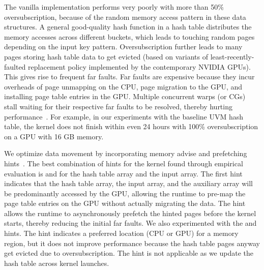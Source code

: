 \documentclass[12pt,a4paper]{article}
\begin{document}
The vanilla implementation performs very poorly with more than 50\%
oversubscription, because of the random memory access pattern in these data
structures. A general good-quality hash function in a hash table distributes the
memory accesses across different buckets, which leads to touching random pages
depending on the input key pattern. Oversubscription further leads to many pages
storing hash table data to get evicted (based on variants of least-recently-faulted replacement
policy implemented by the contemporary NVIDIA GPUs). This gives rise to frequent
far faults. Far faults are expensive because they incur overheads of page
unmapping on the CPU, page migration to the GPU, and installing page table
entries in the GPU. Multiple concurrent warps (or CGs) stall waiting for their
respective far faults to be resolved, thereby hurting
performance~\cite{irregular-page-walks-isca-2018,neighborhood-aware-addr-translation-micro-2018}.
For example, in our experiments with the baseline UVM hash table, the  kernel does not
finish within even 24 hours with 100\% oversubscription on a GPU with 16 GB
memory.

We optimize data movement
by incorporating
memory advise and
prefetching hints~\cite{cuda-programming-guide}.
The best combination of hints for the  kernel found through empirical evaluation is
 and  for the hash table array and the input array.
The first hint indicates that the hash table array, the input array, and the auxiliary array will be predominantly accessed by the GPU, allowing the runtime
to pre-map the page table entries on the GPU without actually migrating the data. The  hint
allows the runtime to asynchronously prefetch the hinted pages before the kernel starts,
thereby reducing the initial far faults.
We also experimented with the  and  hints.
The  hint indicates a preferred location (CPU or GPU) for a memory region, but it does not improve performance
because the hash table pages anyway get evicted due to oversubscription.
The  hint is not applicable as we update the hash table across kernel launches.
\end{document}
